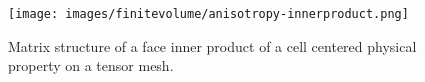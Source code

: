 \begin{figure}[ht]
    \centering
    \texttt{[image: images/finitevolume/anisotropy-innerproduct.png]}
    \caption{Matrix structure of a face inner product of a cell centered physical property on a tensor mesh.}
    \label{fig:finitevolume-anisotropy-innerproduct}
\end{figure}
